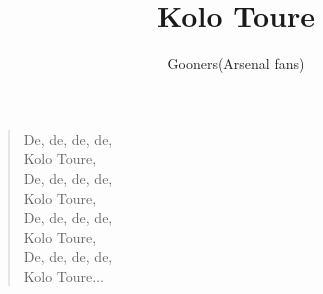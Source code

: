 \documentclass[a4paper,12pt]{article}
\title{Kolo Toure}
\author{Gooners(Arsenal fans)}
\date{}
\begin{document}
	
	\maketitle
	
	\begin{verse}
		
		De, de, de, de, \\
		Kolo Toure, \\
		De, de, de, de, \\
		Kolo Toure, \\
		De, de, de, de, \\
		Kolo Toure, \\
		De, de, de, de, \\
		Kolo Toure$\ldots$
		
	\end{verse}
	
\end{document}
